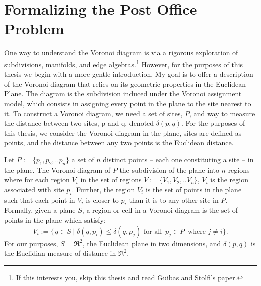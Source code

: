 \documentclass[12pt,twoside]{reedthesis}
\begin{document}
  \section{Formalizing the Post Office Problem} %
  \label{sec:formalizing_the_post_office_problem}
    One way to understand the Voronoi diagram is via a rigorous exploration of subdivisions, manifolds, and edge algebras.\footnote{If this interests you, skip this thesis and read Guibas and Stolfi's paper.\citep{}} However,  for the purposes of this thesis we begin with a more gentle introduction. My goal is to offer a description of the Voronoi diagram that relies on its geometric properties in the Euclidean Plane. The diagram is the subdivision induced under the Voronoi assignment model, which consists in assigning every point in the plane to the site nearest to it. To construct a Voronoi diagram, we need a set of sites, $P$, and way to measure the distance between two sites, p and q, denoted $\delta(p,q)$. For the purposes of this thesis, we consider the Voronoi diagram in the plane, sites are defined as points, and the distance between any two points is the Euclidean distance.\par
    Let $P:=\{p_{1}, p_{2}, .. p_{n}\}$ a set of $n$ distinct points -- each one constituting a site -- in the plane. The Voronoi diagram of $P$ the subdivision of the plane into $n$ regions where for each region $V_{i}$ in the set of regions $V:=\{V_{1}, V_{2}, .. V_{n}\}$, $V_{i}$ is the region associated with site $p_{i}$. Further, the region $V_{i}$ is the set of points in the plane such that each point in $V_{i}$ is closer to $p_{i}$ than it is to any other site in $P$. Formally, given a plane $S$, a region or cell in a Voronoi diagram is the set of points in the plane which satisfy:
    $$V_{i} := \{\,q \in S \mid \delta(q, p_{i}) \leq \delta(q, p_{j}) \text{ for all }\, p_{j}\in P\,\text{ where }j\neq i \}.$$
    For our purposes, $S= \Re^2$, the Euclidean plane in two dimensions, and $\delta(p, q)$ is the Euclidian measure of distance in $\Re^2$. \par
\end{document}

